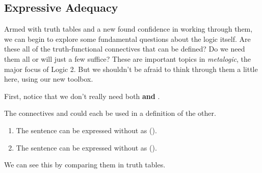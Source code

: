 \subsection{Expressive Adequacy}

Armed with truth tables and a new found confidence in working through them,
we can begin to explore some fundamental questions about the logic itself.
Are these all of the truth-functional connectives that can be defined? Do we
need them all or will just a few suffice? These are important topics in
\emph{metalogic}, the major focus of Logic 2. But we shouldn't be afraid to
think through them a little here, using our new toolbox.

First, notice that we don't really need both \sand \textbf{and} \eor.

\begin{observation}
  The connectives \sand and \sor could each be used in a definition of the
  other.
  \begin{enumerate}
  \item The sentence \ephi\eand\spsi can be expressed without \sand as
    \enot(\enot\ephi\eor\enot\epsi).
 \item The sentence \ephi\eor\spsi can be expressed without \sor as
    \enot(\enot\ephi\eand\enot\epsi).  
  \end{enumerate}
  
\end{observation}

We can see this by comparing them in truth tables.

